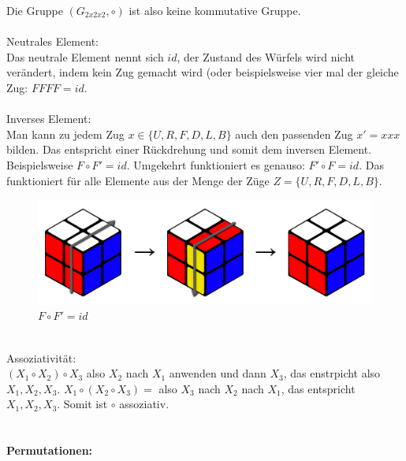 \documentclass[12pt,a4paper, usenames, dvipsnames]{scrartcl}
\begin{document}
Die Gruppe $(G_{2x2x2}, \circ)$ ist also keine kommutative Gruppe. 
\\
\\
Neutrales Element: \\
Das neutrale Element nennt sich $id$, der Zustand des Würfels wird nicht verändert, indem kein Zug gemacht wird (oder beispielsweise vier mal der gleiche Zug: $FFFF = id$. \\
\\
Inverses Element: \\
Man kann zu jedem Zug $x \in \lbrace U, R, F, D, L, B \rbrace$ auch den passenden Zug $x' = xxx$ bilden. Das entspricht einer Rückdrehung und somit dem inversen Element. Beispielsweise $F \circ F' = id$. Umgekehrt funktioniert es genauso: $F' \circ F = id$. Das funktioniert für alle Elemente aus der Menge der Züge $Z=\lbrace U, R, F, D, L, B \rbrace$.
\begin{figure}[h]
\centering
\includegraphics[scale=0.07]{inverses.png}
\caption{$F \circ F' = id$}
\end{figure}
\\
Assoziativität: \\
$(X_1 \circ X_2) \circ X_3$ also $X_2$ nach $X_1$ anwenden und dann $X_3$, das enstrpicht also $X_1, X_2, X_3$.
$X_1 \circ (X_2 \circ X_3) = $ also $X_3$ nach $X_2$ nach $X_1$, das entspricht $X_1, X_2, X_3$.
Somit ist $\circ$ assoziativ. \\
\\
\\
\textbf{Permutationen: } \\
\end{document}
